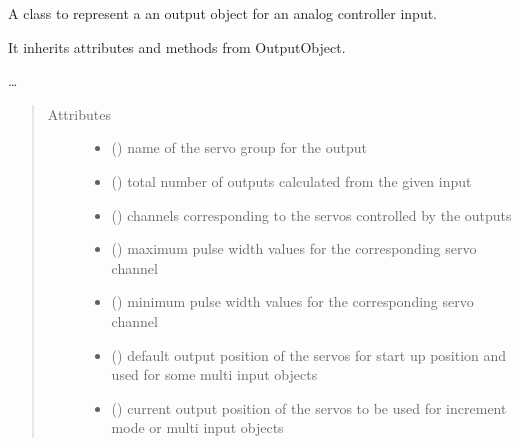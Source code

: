 \documentclass[letterpaper,10pt,english]{sphinxmanual}
\begin{document}
\begin{fulllineitems}
\label{\detokenize{generic:AnalogOutputObject.AnalogOutputObject}}
\sphinxAtStartPar
A class to represent a an output object for an analog controller input.

\sphinxAtStartPar
It inherits attributes and methods from OutputObject.

\sphinxAtStartPar
…
\begin{quote}\begin{description}
\item[{Attributes}] \leavevmode\begin{itemize}
\item {} 
\sphinxAtStartPar
{}() \textendash{} name of the servo group for the output

\item {} 
\sphinxAtStartPar
{}() \textendash{} total number of outputs 
calculated from the given input

\item {} 
\sphinxAtStartPar
{}(\sphinxstyleemphasis{{[}int{]}}) \textendash{} channels corresponding to 
the servos controlled by the outputs

\item {} 
\sphinxAtStartPar
{}(\sphinxstyleemphasis{{[}int{]}}) \textendash{} maximum pulse width values 
for the corresponding servo channel

\item {} 
\sphinxAtStartPar
{}(\sphinxstyleemphasis{{[}int{]}}) \textendash{} minimum pulse width values 
for the corresponding servo channel

\item {} 
\sphinxAtStartPar
{}(\sphinxstyleemphasis{{[}int{]}}) \textendash{} default output position of 
the servos for start up position and used for some multi input 
objects

\item {} 
\sphinxAtStartPar
{}(\sphinxstyleemphasis{{[}int{]}}) \textendash{} current output position of the 
servos to be used for increment mode or multi input objects


\end{itemize}
\end{description}
\end{quote}
\end{fulllineitems}
\end{document}
